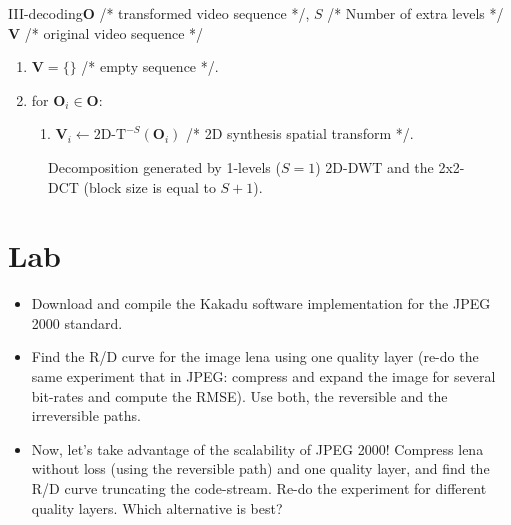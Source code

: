 \begin{myalg}{III-decoding}{$\mathbf{O}$ /* transformed video sequence */, $S$ /* Number of extra levels */}{$\mathbf{V}$ /* original video sequence */}
  \label{alg:III_decoding}
  \begin{enumerate}
  \item ${\mathbf V}=\{\}$ /* empty sequence */.
  \item for ${\mathbf O}_i\in {\mathbf O}$:
    \begin{enumerate}
    \item ${\mathbf V}_i\leftarrow\text{2D-T}^{-S}({\mathbf O}_i)$ /* 2D synthesis spatial transform */.
    \end{enumerate}
  \end{enumerate}
\end{myalg}

\begin{figure}
  \centering
  \caption{Decomposition generated by 1-levels ($S=1$) 2D-DWT and the 2x2-DCT (block size is equal to $S+1$).}
  \label{fig:III}
\end{figure}

\section*{Lab}
\begin{itemize}
\item Download and compile the Kakadu software implementation for the
  JPEG 2000 standard.
\item Find the R/D curve for the image lena using one quality layer
  (re-do the same experiment that in JPEG: compress and expand
  the image for several bit-rates and compute the RMSE). Use both, the
  reversible and the irreversible paths.
\item Now, let's take advantage of the scalability of JPEG 2000!
  Compress lena without loss (using the reversible path) and one
  quality layer, and find the R/D curve truncating the
  code-stream. Re-do the experiment for different quality
  layers. Which alternative is best?
\end{itemize}

